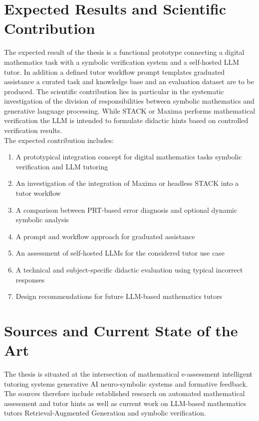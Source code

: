 \documentclass[11pt,a4paper,oneside,ngerman]{memoir}
\begin{document}
\chapter{Expected Results and Scientific Contribution}
The expected result of the thesis is a functional prototype connecting a digital mathematics task with a symbolic verification system and a self-hosted LLM tutor. In addition a defined tutor workflow prompt templates graduated assistance a curated task and knowledge base and an evaluation dataset are to be produced.
The scientific contribution lies in particular in the systematic investigation of the division of responsibilities between symbolic mathematics and generative language processing. While STACK or Maxima performs mathematical verification the LLM is intended to formulate didactic hints based on controlled verification results.
\hspace{1 cm}\\
The expected contribution includes:
\begin{enumerate}
    \item A prototypical integration concept for digital mathematics tasks symbolic verification and LLM tutoring
    \item An investigation of the integration of Maxima or headless STACK into a tutor workflow
    \item A comparison between PRT-based error diagnosis and optional dynamic symbolic analysis
    \item A prompt and workflow approach for graduated assistance
    \item An assessment of self-hosted LLMs for the considered tutor use case
    \item A technical and subject-specific didactic evaluation using typical incorrect responses
    \item Design recommendations for future LLM-based mathematics tutors
\end{enumerate}
\chapter{Sources and Current State of the Art}
The thesis is situated at the intersection of mathematical e-assessment intelligent tutoring systems generative AI neuro-symbolic systems and formative feedback. The sources therefore include established research on automated mathematical assessment and tutor hints as well as current work on LLM-based mathematics tutors Retrieval-Augmented Generation and symbolic verification.
\end{document}
